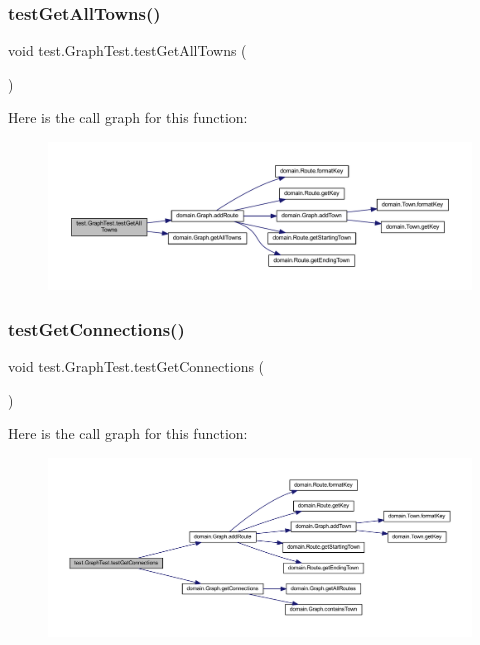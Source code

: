 \subsubsection{\texorpdfstring{test\+Get\+All\+Towns()}{testGetAllTowns()}}
{\footnotesize\ttfamily void test.\+Graph\+Test.\+test\+Get\+All\+Towns (\begin{DoxyParamCaption}{ }\end{DoxyParamCaption})}

Here is the call graph for this function\+:\nopagebreak
\begin{figure}[H]
\begin{center}
\leavevmode
\includegraphics[width=350pt]{classtest_1_1_graph_test_a8979ac672a459b1549444d94b4e4b46f_cgraph}
\end{center}
\end{figure}
\mbox{\label{classtest_1_1_graph_test_a6e5d6e42cbf0773c9fde59fbb0e38056}} 
\subsubsection{\texorpdfstring{test\+Get\+Connections()}{testGetConnections()}}
{\footnotesize\ttfamily void test.\+Graph\+Test.\+test\+Get\+Connections (\begin{DoxyParamCaption}{ }\end{DoxyParamCaption})}

Here is the call graph for this function\+:\nopagebreak
\begin{figure}[H]
\begin{center}
\leavevmode
\includegraphics[width=350pt]{classtest_1_1_graph_test_a6e5d6e42cbf0773c9fde59fbb0e38056_cgraph}
\end{center}
\end{figure}
\mbox{\label{classtest_1_1_graph_test_a44c05e3ce8e8f248813e7f7073b83b40}} 

